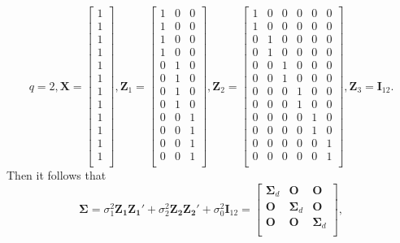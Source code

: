 \[
q = 2,  \bm X = \left[
\begin{array}{c}
1\\
1\\
1\\
1\\
1\\
1\\
1\\
1\\
1\\
1\\
1\\
1\\
\end{array}
\right],
\bm Z_1=\left[
\begin{array}{ccc}
1 & 0 & 0 \\
1 & 0 & 0 \\
1 & 0 & 0 \\
1 & 0 & 0 \\
0 & 1 & 0 \\
0 & 1 & 0 \\
0 & 1 & 0 \\
0 & 1 & 0 \\
0 & 0 & 1 \\
0 & 0 & 1 \\
0 & 0 & 1 \\
0 & 0 & 1 \\
\end{array}
\right],
\bm Z_2=\left[
\begin{array}{cccccc}
1 & 0 & 0  & 0 & 0  &0\\
1 & 0 & 0  & 0 & 0  &0\\
0 & 1 & 0  & 0 & 0  &0\\
0 & 1 & 0  & 0 & 0  &0\\
0 & 0 & 1  & 0 & 0  &0\\
0 & 0 & 1  & 0 & 0  &0\\
0 & 0 & 0  & 1 & 0  &0\\
0 & 0 & 0  & 1 & 0  &0\\
0 & 0 & 0  & 0 & 1  &0\\
0 & 0 & 0  & 0 & 1  &0\\
0 & 0 & 0  & 0 & 0  &1\\
0 & 0 & 0  & 0 & 0  &1\\
\end{array}
\right], \bm Z_3 = \bm I_{12}.
\]
Then it follows that 
\[\bm\Sigma = \sigma_1^2\bm{Z_1Z_1'} + \sigma_2^2\bm{Z_2Z_2'} + \sigma_0^2\bm I_{12}=
\left[
\begin{array}{ccc}
\bm\Sigma_d  & \bm O  &\bm O\\
\bm O & \bm\Sigma_d  & \bm O \\
\bm O  &\bm O   & \bm\Sigma_d\\
\end{array}
\right],\]
